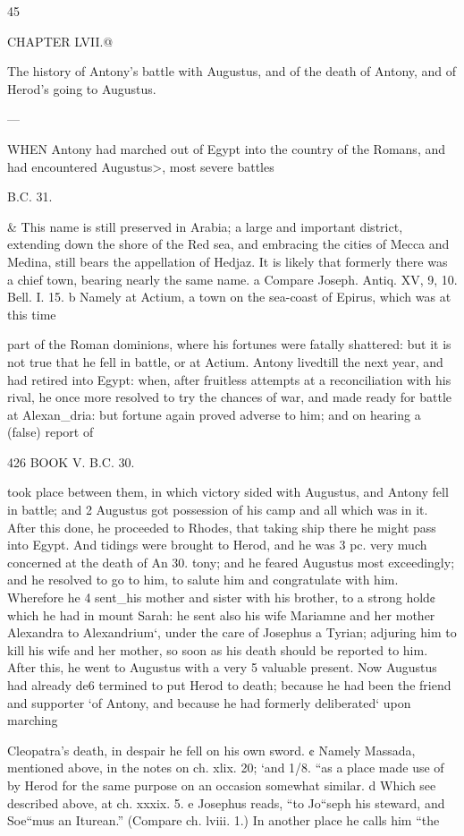 45 

CHAPTER LVII.@ 

The history of Antony's battle with Augustus, and of the death of Antony, and of Herod’s going to Augustus. 

— 

WHEN Antony had marched out of Egypt into the country of the Romans, and had encountered Augustus>, most severe battles 

B.C. 31. 

& This name is still preserved in Arabia; a large and important district, extending down the shore of the Red sea, and embracing the cities of Mecca and Medina, still bears the appellation of Hedjaz. It is likely that formerly there was a chief town, bearing nearly the same name. 
a Compare Joseph. Antiq. XV, 9, 10. Bell. I. 15. 
b Namely at Actium, a town on the sea-coast of Epirus, which was at this time 

part of the Roman dominions, where his fortunes were fatally shattered: but it is not true that he fell in battle, or at Actium. Antony livedtill the next year, and had retired into Egypt: when, after fruitless attempts at a reconciliation with his rival, he once more resolved to try the chances of war, and made ready for battle at Alexan_dria: but fortune again proved adverse to him; and on hearing a (false) report of 

426 BOOK V. B.C. 30. 

took place between them, in which victory sided with Augustus, and Antony fell in battle; and 2 Augustus got possession of his camp and all which was in it. After this done, he proceeded to Rhodes, that taking ship there he might pass into Egypt. 
And tidings were brought to Herod, and he was 3 
pc. very much concerned at the death of An
30. tony; and he feared Augustus most exceedingly; and he resolved to go to him, to salute him and congratulate with him. Wherefore he 4 
sent_his mother and sister with his brother, to a strong hold¢ which he had in mount Sarah: he sent also his wife Mariamne and her mother Alexandra to Alexandrium‘, under the care of Josephus a Tyrian; adjuring him to kill his wife and her mother, so soon as his death should be reported to him. 
After this, he went to Augustus with a very 5 valuable present. Now Augustus had already de6 termined to put Herod to death; because he had been the friend and supporter ‘of Antony, and because he had formerly deliberated‘ upon marching 

Cleopatra’s death, in despair he fell on his own sword. 
¢ Namely Massada, mentioned above, in the notes on ch. xlix. 20; ‘and 1/8. “as a place made use of by Herod for the same purpose on an occasion somewhat similar. 
d Which see described above, at ch. xxxix. 5. 
e Josephus reads, “to Jo“seph his steward, and Soe“mus an Iturean.” (Compare ch. lviii. 1.) In another place he calls him “the 

